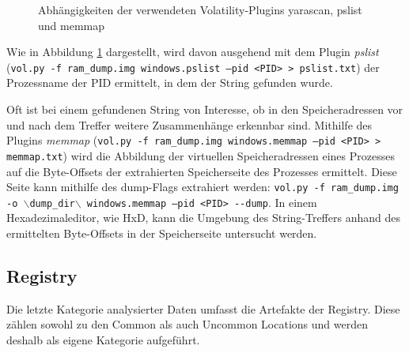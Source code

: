\begin{figure}[h!]
	\centering
	\small
	\centerline{\resizebox{\linewidth}{!}{}}
	\caption{Abhängigkeiten der verwendeten Volatility-Plugins yarascan, pslist und memmap}
	\label{img:volatility-plugins}
\end{figure}

Wie in Abbildung \ref{img:volatility-plugins} dargestellt, wird davon ausgehend mit dem Plugin \textit{pslist} (\texttt{vol.py -f ram\_dump.img windows.pslist --pid <PID> > pslist.txt}) der Prozessname der PID ermittelt, in dem der String gefunden wurde.

Oft ist bei einem gefundenen String von Interesse, ob in den Speicheradressen vor und nach dem Treffer weitere Zusammenhänge erkennbar sind.
Mithilfe des Plugins \textit{memmap} (\texttt{vol.py -f ram\_dump.img windows.memmap --pid <PID> > memmap.txt}) wird die Abbildung der virtuellen Speicheradressen eines Prozesses auf die Byte-Offsets der extrahierten Speicherseite des Prozesses ermittelt.
Diese Seite kann mithilfe des \glqq{}dump\grqq{}-Flags extrahiert werden: \texttt{vol.py -f ram\_dump.img -o $\backslash$dump\_dir$\backslash$ windows.memmap --pid <PID> -{}-dump}.
In einem Hexadezimaleditor, wie HxD, kann die Umgebung des String-Treffers anhand des ermittelten Byte-Offsets in der Speicherseite untersucht werden.

\subsection{Registry}
\label{subsection:methodik-datenanalyse-registry}
Die letzte Kategorie analysierter Daten umfasst die Artefakte der Registry.
Diese zählen sowohl zu den Common als auch Uncommon Locations und werden deshalb als eigene Kategorie aufgeführt.

